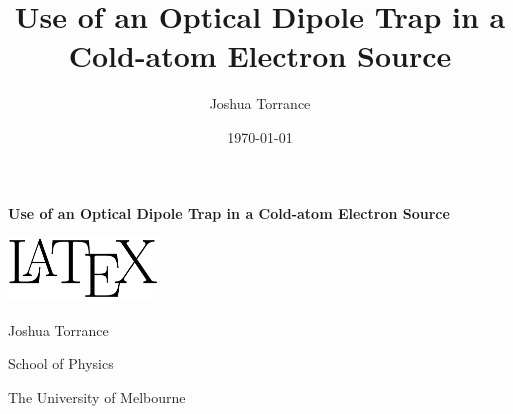 \documentclass[12pt]{book}
\title{Use of an Optical Dipole Trap in a Cold-atom Electron Source}
\author{Joshua Torrance}
\date{\today}
\begin{document}


    \renewcommand{\footnotesize}{\small}
    \renewcommand{\footnoterule}{\relax}
    \thispagestyle{empty}
    \begin{center}
        { \Huge {\bfseries {Use of an Optical Dipole Trap in a Cold-atom Electron Source}} \par}
    {\large \vspace*{35mm} {{\includegraphics[width=4cm]{figs/logo.png}} \par} \vspace*{25mm}}
        {{\vspace*{30mm} \Large {Joshua Torrance}} \par} 
    {\large 
	    \vspace*{1ex}
        {{School of Physics} \par}
	    \vspace*{1ex}
        {{The University of Melbourne} \par}
	    \vspace*{25mm}
    }%
    \end{center}
    \null\vfill

\tableofcontents
{}

\renewcommand{\chaptername}{} %








\printglossaries
\newpage

{}

\end{document}

